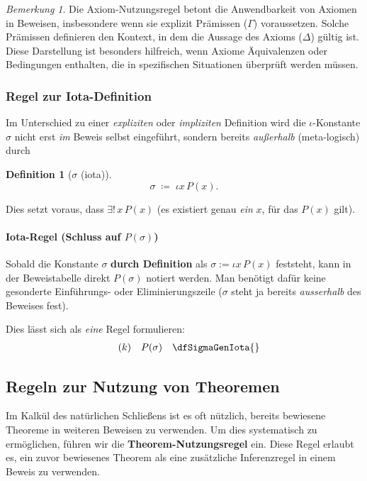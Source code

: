 \documentclass{book}
\theoremstyle{plain}
\theoremstyle{remark}
\newtheorem*{remark}{Bemerkung}
\theoremstyle{definition}
\newtheorem{definition}{Definition}[section]
\begin{document}
\begin{remark}
Die Axiom-Nutzungsregel betont die Anwendbarkeit von Axiomen in Beweisen, insbesondere wenn sie explizit Prämissen (\(\Gamma\)) voraussetzen. Solche Prämissen definieren den Kontext, in dem die Aussage des Axioms (\(\Delta\)) gültig ist. Diese Darstellung ist besonders hilfreich, wenn Axiome Äquivalenzen oder Bedingungen enthalten, die in spezifischen Situationen überprüft werden müssen.
\end{remark}


\subsubsection{Regel zur Iota-Definition}

Im Unterschied zu einer \emph{expliziten} oder \emph{impliziten} Definition wird die \(\iota\)-Konstante \(\sigma\) nicht erst \emph{im} Beweis selbst eingeführt, sondern bereits \emph{außerhalb} (meta-logisch) durch
\begin{definition}[\(\sigma\) (iota)]
\label{dfSigmaGenIota}
\[
\sigma \;\coloneqq\; \iota x \, P(x).
\]
\end{definition}
Dies setzt voraus, dass \(\exists!\,x\,P(x)\) (es existiert genau \emph{ein} \(x\), für das \(P(x)\) gilt). 

\paragraph{Iota-Regel (Schluss auf \(P(\sigma)\))}
Sobald die Konstante \(\sigma\) \textbf{durch Definition} als \(\sigma := \iota x \, P(x)\) feststeht, kann in der Beweistabelle direkt \(P(\sigma)\) notiert werden. Man benötigt dafür keine gesonderte Einführungs- oder Eliminierungszeile (\(\sigma\) steht ja bereits \emph{ausserhalb} des Beweises fest). 

Dies lässt sich als \emph{eine} Regel formulieren:
\[
\begin{array}{llll}
   & (k) & P(\sigma) & \dfSigmaGenIota{} \\
\end{array}
\]



\subsection{Regeln zur Nutzung von Theoremen}
\label{rule:TheoremUsage}

Im Kalkül des natürlichen Schließens ist es oft nützlich, bereits bewiesene Theoreme in weiteren Beweisen zu verwenden. Um dies systematisch zu ermöglichen, führen wir die \textbf{Theorem-Nutzungsregel} ein. Diese Regel erlaubt es, ein zuvor bewiesenes Theorem als eine zusätzliche Inferenzregel in einem Beweis zu verwenden.
\end{document}
